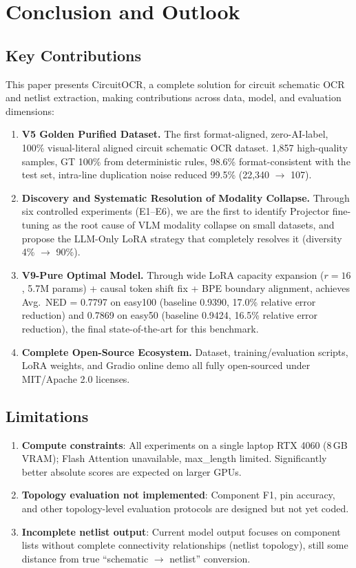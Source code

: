 \section{Conclusion and Outlook}

\subsection{Key Contributions}

This paper presents CircuitOCR, a complete solution for circuit schematic OCR and netlist extraction, making contributions across data, model, and evaluation dimensions:

\begin{enumerate}
    \item \textbf{V5 Golden Purified Dataset.} The first format-aligned, zero-AI-label, 100\% visual-literal aligned circuit schematic OCR dataset. 1,857 high-quality samples, GT 100\% from deterministic rules, 98.6\% format-consistent with the test set, intra-line duplication noise reduced 99.5\% (22,340 $\to$ 107).
    \item \textbf{Discovery and Systematic Resolution of Modality Collapse.} Through six controlled experiments (E1--E6), we are the first to identify Projector fine-tuning as the root cause of VLM modality collapse on small datasets, and propose the LLM-Only LoRA strategy that completely resolves it (diversity 4\% $\to$ 90\%).
    \item \textbf{V9-Pure Optimal Model.} Through wide LoRA capacity expansion ($r=16$, 5.7M params) + causal token shift fix + BPE boundary alignment, achieves Avg.\ NED = 0.7797 on easy100 (baseline 0.9390, 17.0\% relative error reduction) and 0.7869 on easy50 (baseline 0.9424, 16.5\% relative error reduction), the final state-of-the-art for this benchmark.
    \item \textbf{Complete Open-Source Ecosystem.} Dataset, training/evaluation scripts, LoRA weights, and Gradio online demo all fully open-sourced under MIT/Apache 2.0 licenses.
\end{enumerate}

\subsection{Limitations}

\begin{enumerate}
    \item \textbf{Compute constraints}: All experiments on a single laptop RTX 4060 (8\,GB VRAM); Flash Attention unavailable, max\_length limited. Significantly better absolute scores are expected on larger GPUs.
    \item \textbf{Topology evaluation not implemented}: Component F1, pin accuracy, and other topology-level evaluation protocols are designed but not yet coded.
    \item \textbf{Incomplete netlist output}: Current model output focuses on component lists without complete connectivity relationships (netlist topology), still some distance from true ``schematic $\to$ netlist'' conversion.
\end{enumerate}

